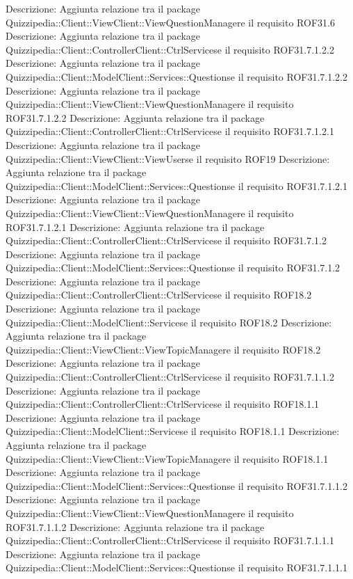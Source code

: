 Descrizione: Aggiunta relazione tra il package Quizzipedia::Client::ViewClient::ViewQuestionManagere il requisito ROF31.6 
Descrizione: Aggiunta relazione tra il package Quizzipedia::Client::ControllerClient::CtrlServicese il requisito ROF31.7.1.2.2 
Descrizione: Aggiunta relazione tra il package Quizzipedia::Client::ModelClient::Services::Questionse il requisito ROF31.7.1.2.2 
Descrizione: Aggiunta relazione tra il package Quizzipedia::Client::ViewClient::ViewQuestionManagere il requisito ROF31.7.1.2.2 
Descrizione: Aggiunta relazione tra il package Quizzipedia::Client::ControllerClient::CtrlServicese il requisito ROF31.7.1.2.1 
Descrizione: Aggiunta relazione tra il package Quizzipedia::Client::ViewClient::ViewUserse il requisito ROF19 
Descrizione: Aggiunta relazione tra il package Quizzipedia::Client::ModelClient::Services::Questionse il requisito ROF31.7.1.2.1 
Descrizione: Aggiunta relazione tra il package Quizzipedia::Client::ViewClient::ViewQuestionManagere il requisito ROF31.7.1.2.1 
Descrizione: Aggiunta relazione tra il package Quizzipedia::Client::ControllerClient::CtrlServicese il requisito ROF31.7.1.2 
Descrizione: Aggiunta relazione tra il package Quizzipedia::Client::ModelClient::Services::Questionse il requisito ROF31.7.1.2 
Descrizione: Aggiunta relazione tra il package Quizzipedia::Client::ControllerClient::CtrlServicese il requisito ROF18.2 
Descrizione: Aggiunta relazione tra il package Quizzipedia::Client::ModelClient::Servicese il requisito ROF18.2 
Descrizione: Aggiunta relazione tra il package Quizzipedia::Client::ViewClient::ViewTopicManagere il requisito ROF18.2 
Descrizione: Aggiunta relazione tra il package Quizzipedia::Client::ControllerClient::CtrlServicese il requisito ROF31.7.1.1.2 
Descrizione: Aggiunta relazione tra il package Quizzipedia::Client::ControllerClient::CtrlServicese il requisito ROF18.1.1 
Descrizione: Aggiunta relazione tra il package Quizzipedia::Client::ModelClient::Servicese il requisito ROF18.1.1 
Descrizione: Aggiunta relazione tra il package Quizzipedia::Client::ViewClient::ViewTopicManagere il requisito ROF18.1.1 
Descrizione: Aggiunta relazione tra il package Quizzipedia::Client::ModelClient::Services::Questionse il requisito ROF31.7.1.1.2 
Descrizione: Aggiunta relazione tra il package Quizzipedia::Client::ViewClient::ViewQuestionManagere il requisito ROF31.7.1.1.2 
Descrizione: Aggiunta relazione tra il package Quizzipedia::Client::ControllerClient::CtrlServicese il requisito ROF31.7.1.1.1 
Descrizione: Aggiunta relazione tra il package Quizzipedia::Client::ModelClient::Services::Questionse il requisito ROF31.7.1.1.1 
